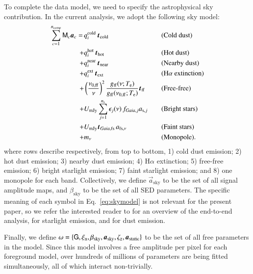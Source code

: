 \documentclass{aa}
\renewcommand{\t}[0]{\vec{t}}
\newcommand{\G}[0]{\tens{G}}
\renewcommand{\a}[0]{\vec{a}}
\newcommand{\M}[0]{\tens{M}}
\newcommand{\Te}[0]{T_{\rm e}}
\def\GAIA{\textit{Gaia}}
\def\gaia{\textit{Gaia}}
\def\nuzeroff{\ifmmode \nu_{0,\mathrm{ff}}\else $\nu_{0,\mathrm{ff}}$\fi}
\def\Te{\ifmmode T_{\mathrm{e}}\else $T_{\mathrm{e}}$\fi}
\begin{document}
To complete the data model, we need to specify the astrophysical sky
contribution. In the current analysis, we adopt the following sky model:
\begin{alignat}{4}
  \sum_{c=1}^{n_{\mathrm{comp}}} \M_c \a_c  = \,
  &q^{\mathrm{cold}}_i\,\t_{\mathrm{cold}}
  && \textrm{(Cold dust)}\label{eq:skymodel}\\
  + &q_i^{\mathrm{hot}}\,
  \t_{\mathrm{hot}} && \textrm{(Hot dust)}\nonumber \\
  + &q_i^{\mathrm{near}}\, \t_{\mathrm{near}}
 && \textrm{(Nearby dust)} \nonumber \\
  + &q_i^{\mathrm{ext}}\,\t_{\mathrm{ext}}
  && \textrm{(H${\alpha}$ extinction)}\nonumber\\ %
  + &\left(\frac{\nuzeroff}{\nu}\right)^2
  \frac{g_{\mathrm{ff}}(\nu;\Te) }{g_{\mathrm{ff}}(\nuzeroff;\Te)}
  \vec{t}_{\mathrm{ff}} && \textrm{(Free-free)} \nonumber\\
  + &U_{\mathrm{mJy}} \sum_{j=1}^{n_{\mathrm{s}}}
  \epsilon_j(\nu)\,f_{\GAIA,j} a_{\mathrm{s},j} &\quad&
  \textrm{(Bright stars)} \nonumber\\
  + &U_{\mathrm{mJy}} \t_{\gaia,\mathrm{fs}}\, a_{\mathrm{fs},\nu} &\quad&
  \textrm{(Faint stars)} \nonumber\\  
  + &m_{\nu} && \textrm{(Monopole)}. \nonumber
\end{alignat}
where rows describe respectively, from top to bottom, 1) cold dust
emission; 2) hot dust emission; 3) nearby dust emission; 4) H$\alpha$ extinction; 5) free-free
emission; 6) bright starlight
emission; 7) faint starlight emission; and
8) one monopole for each band. Collectively, we define
$\a_{\mathrm{sky}}$ to be the set of all signal amplitude maps, and
$\beta_{\mathrm{sky}}$ to be the set of all SED parameters. The
specific meaning of each symbol in Eq.~\eqref{eq:skymodel} is not
relevant for the present paper, so we
refer the interested reader to \citet{CG02_01} for an overview of the end-to-end analysis, \citet{CG02_04} for starlight emission, and \citet{CG02_05} for dust emission.


Finally, we define $\omega = \{\G,\xi_{\mathrm{n}},
\beta_{\mathrm{sky}},\a_{\mathrm{sky}},\zeta_{\mathrm{z}},\a_{\mathrm{static}}\}$
to be the set of all free parameters in the model. Since this model involves
a free amplitude per pixel for each foreground model, over
hundreds of millions of parameters are being fitted simultaneously,
all of which interact non-trivially.
\end{document}
